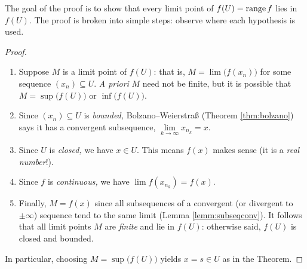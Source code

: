 \goodbreak

The goal of the proof is to show that every limit point of $f(U)=\operatorname{range} f$ lies in $f(U)$. The proof is broken into simple steps: observe where each hypothesis is used.

\begin{proof}
\begin{enumerate}\itemsep2pt
  \item Suppose $M$ is a limit point of $f(U)$: that is, $M=\lim\bigl(f(x_n)\bigr)$ for some sequence $(x_n)\subseteq U$.	\emph{A priori} $M$ need not be finite, but it is possible\footnotemark{} that $M=\sup\bigl(f(U)\bigr)$ or $\inf\bigl(f(U)\bigr)$.
	\item Since $(x_n)\subseteq U$ is \emph{bounded,} Bolzano--Weierstraß (Theorem \ref{thm:bolzano}) says it has a convergent subsequence, $\lim\limits_{k\to\infty}x_{n_k}=x$.
	\item	Since $U$ is \emph{closed,} we have $x\in U$. This means $f(x)$ makes sense (it is a \emph{real number}!).
	\item	Since $f$ is \emph{continuous,} we have $\lim f(x_{n_k})=f(x)$.
	\item	Finally, $M=f(x)$ since all subsequences of a convergent (or divergent to $\pm\infty$) sequence tend to the same limit (Lemma \ref{lemm:subseqconv}). It follows that all limit points $M$ are \emph{finite} and lie in $f(U)$: otherwise said, $f(U)$ is closed and bounded.
\end{enumerate}
\medskip
In particular, choosing $M=\sup\bigl(f(U)\bigr)$ yields $x=s\in U$ as in the Theorem.
\end{proof}



